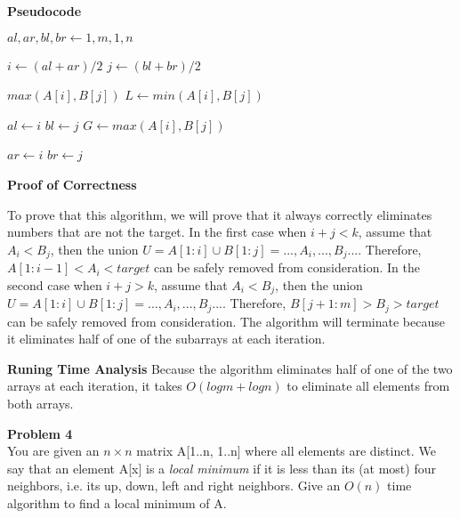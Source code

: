 \documentclass[12pt,article]{article}
\newenvironment{problem}[2][Problem]
    { \begin{mdframed}[backgroundcolor=gray!20] \textbf{#1 #2} \\}
    {  \end{mdframed}}
\begin{document}
\textbf{Pseudocode}

\begin{algorithm}
\caption{$FK(A[1:m],B[1:n]),k$}\label{alg:q3}
\begin{algorithmic}
    \State $al, ar, bl, br \gets 1,m,1,n$
    
        \State $i \gets (al + ar) / 2$
        \State $j \gets (bl + br) / 2$

            \Return $max(A[i],B[j])$
            \State $L \gets min(A[i],B[j])$

                \State $al \gets i$
            \Else
                \State $bl \gets j$
            \EndIf
        \Else
            \State $G \gets max(A[i],B[j])$

                \State $ar \gets i$
            \Else
                \State $br \gets j$
            \EndIf
        \EndIf
    \EndWhile
\end{algorithmic}
\end{algorithm}

\textbf{Proof of Correctness}

To prove that this algorithm, we will prove that it always correctly eliminates numbers that are not the target. In the first case when $i + j < k$, assume that $A_i < B_j$, then the union $U = A[1:i] \cup B[1:j] = ...,A_i,...,B_j...$. Therefore, $A[1:i-1] < A_i < target$ can be safely removed from consideration. In the second case when $i + j > k$, assume that $A_i < B_j$, then the union $U = A[1:i] \cup B[1:j] = ...,A_i,...,B_j...$. Therefore, $B[j+1:m] > B_j > target$ can be safely removed from consideration. The algorithm will terminate because it eliminates half of one of the subarrays at each iteration. 

\textbf{Runing Time Analysis}
Because the algorithm eliminates half of one of the two arrays at each iteration, it takes $O(logm + logn)$ to eliminate all elements from both arrays.

\newpage
\begin{problem}{4} 
You are given an $n \times n$ matrix A[1..n, 1..n] where all elements are distinct. We say that an element A[x] is a \textit{local minimum} if it is less than its (at most) four neighbors, i.e. its up, down, left and right neighbors. Give an $O(n)$ time algorithm to find a local minimum of A.
\end{problem}
\end{document}
